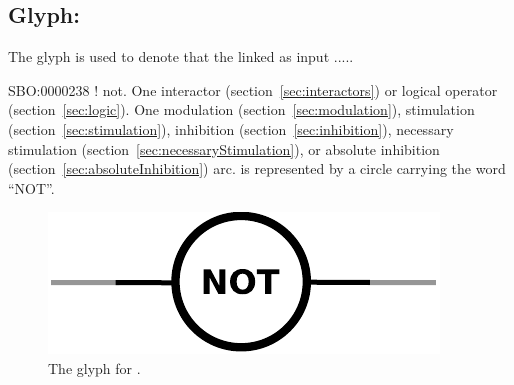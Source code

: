 \subsection{Glyph: }\label{sec:not}

The glyph  is used to denote that the  linked as input .....


\begin{glyphDescription}
 \glyphSboTerm SBO:0000238 ! not.
 \glyphOrigin One interactor (section~\ref{sec:interactors}) or logical operator (section~\ref{sec:logic}).
 \glyphTarget  One modulation (section~\ref{sec:modulation}), stimulation (section~\ref{sec:stimulation}), inhibition (section~\ref{sec:inhibition}), necessary  stimulation (section~\ref{sec:necessaryStimulation}), or absolute inhibition (section~\ref{sec:absoluteInhibition}) arc.
 \glyphNode {} is represented by a circle carrying the word ``NOT''.
 \end{glyphDescription}

\begin{figure}[H]
  \centering
  \includegraphics[scale = 0.5]{images/not}
  \caption{The \PD glyph for .}
  \label{fig:not}
\end{figure}

